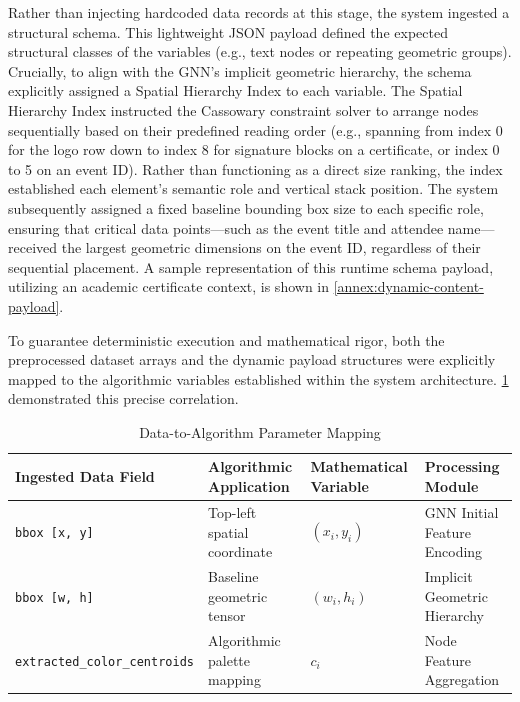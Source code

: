 \begin{refsection}
Rather than injecting hardcoded data records at this stage, the system ingested a structural schema. This lightweight JSON payload defined the expected structural classes of the variables (e.g., text nodes or repeating geometric groups). Crucially, to align with the GNN’s implicit geometric hierarchy, the schema explicitly assigned a Spatial Hierarchy Index to each variable. The Spatial Hierarchy Index instructed the Cassowary constraint solver to arrange nodes sequentially based on their predefined reading order (e.g., spanning from index 0 for the logo row down to index 8 for signature blocks on a certificate, or index 0 to 5 on an event ID). Rather than functioning as a direct size ranking, the index established each element's semantic role and vertical stack position. The system subsequently assigned a fixed baseline bounding box size to each specific role, ensuring that critical data points—such as the event title and attendee name—received the largest geometric dimensions on the event ID, regardless of their sequential placement. A sample representation of this runtime schema payload, utilizing an academic certificate context, is shown in \ref{annex:dynamic-content-payload}.




To guarantee deterministic execution and mathematical rigor, both the preprocessed dataset arrays and the dynamic payload structures were explicitly mapped to the algorithmic variables established within the system architecture. \ref{tab:ingested-data-fields} demonstrated this precise correlation.

\begin{table}[ht]
\centering
\caption{Data-to-Algorithm Parameter Mapping}
\label{tab:ingested-data-fields}
\begin{tabular}{p{} p{} p{} p{}}
\hline
\textbf{Ingested Data Field} & \centering\textbf{Algorithmic Application} & \centering\textbf{Mathematical Variable} & \centering\textbf{Processing Module}\arraybackslash \\ \hline

\texttt{bbox [x, y]} 
& Top-left spatial coordinate 
& $(x_i, y_i)$ 
& GNN Initial Feature Encoding \\

\texttt{bbox [w, h]} 
& Baseline geometric tensor 
& $(w_i, h_i)$ 
& Implicit Geometric Hierarchy \\

\texttt{extracted\_\allowbreak color\_\allowbreak centroids} 
& Algorithmic palette mapping 
& $c_i$ 
& Node Feature Aggregation \\


\end{tabular}
\end{table}
\end{refsection}
